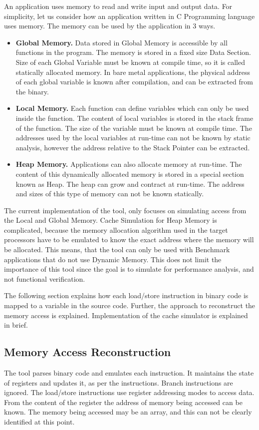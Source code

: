 An application uses memory to read and write input and output data. For simplicity, let us consider how an application written in C Programming language uses memory. The memory can be used by the application in 3 ways. 

\begin{itemize} \itemsep -6pt
\item \textbf{Global Memory.} Data stored in Global Memory is accessible by all functions in the program. The memory is stored in a fixed size Data Section. Size of each Global Variable must be known at compile time, so it is called statically allocated memory. In bare metal applications, the physical address of each global variable is known after compilation, and can be extracted from the binary.
\item \textbf{Local Memory.} Each function can define variables which can only be used inside the function. The content of local variables is stored in the stack frame of the function. The size of the variable must be known at compile time. The addresses used by the local variables at run-time can not be known by static analysis, however the address relative to the Stack Pointer can be extracted.
\item \textbf{Heap Memory.} Applications can also allocate memory at run-time. The content of this dynamically allocated memory is stored in a special section known as Heap. The heap can grow and contract at run-time. The address and sizes of this type of memory can not be known statically. 
\end{itemize}

The current implementation of the tool, only focuses on simulating access from the Local and Global Memory. Cache Simulation for Heap Memory is complicated, because the memory allocation algorithm used in the target processors have to be emulated to know the exact address where the memory will be allocated. This means, that the tool can only be used with Benchmark applications that do not use Dynamic Memory. This does not limit the importance of this tool since the goal is to simulate for performance analysis, and not functional verification. %

The following section explains how each load/store instruction in binary code is mapped to a variable in the source code. Further, the approach to reconstruct the memory access is explained. Implementation of the cache simulator is explained in brief.

\subsection{Memory Access Reconstruction}
The tool parses binary code and emulates each instruction. It maintains the state of registers and updates it, as per the instructions. Branch instructions are ignored. The load/store instructions use register addressing modes to access data. From the content of the register the address of memory being accessed can be known. The memory being accessed may be an array, and this can not be clearly identified at this point.

